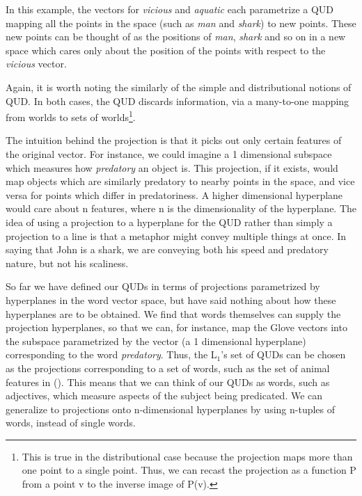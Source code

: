 \documentclass[10pt,letterpaper,twocolumn]{article}
\begin{document}
In this example, the vectors for \emph{vicious} and \emph{aquatic} each parametrize a QUD mapping all the points in the space (such as \emph{man} and \emph{shark}) to new points. These new points can be thought of as the positions of \emph{man}, \emph{shark} and so on in a new space which cares only about the position of the points with respect to the \emph{vicious} vector. 

Again, it is worth noting the similarly of the simple and distributional notions of QUD. In both cases, the QUD discards information, via a many-to-one mapping from worlds to sets of worlds\footnote{This is true in the distributional case because the projection  maps more than one point to a single point. Thus, we can recast the projection as a function P from a point v to the inverse image of P(v).}.

   


The intuition behind the projection is that it picks out only certain features of the original vector. For instance, we could imagine a 1 dimensional subspace which measures how \emph{predatory} an object is. This projection, if it exists, would map objects which are similarly predatory to nearby points in the space, and vice versa for points which differ in predatoriness. A higher dimensional hyperplane would care about n features, where n is the dimensionality of the hyperplane. The idea of using a projection to a hyperplane for the QUD rather than simply a projection to a line is that a metaphor might convey multiple things at once. In saying that John is a shark, we are conveying both his speed and predatory nature, but not his scaliness.

So far we have defined our QUDs in terms of projections parametrized by hyperplanes in the word vector space, but have said nothing about how these hyperplanes are to be obtained. We find that words themselves can supply the projection hyperplanes, so that we can, for instance, map the Glove vectors into the subspace parametrized by the vector (a 1 dimensional hyperplane) corresponding to the word \emph{predatory}. Thus, the L$_1$'s set of QUDs can be chosen as the projections corresponding to a set of words, such as the set of animal features in (\cite{kao}). This means that we can think of our QUDs as words, such as adjectives, which measure aspects of the subject being predicated. We can generalize to projections onto n-dimensional hyperplanes by using n-tuples of words, instead of single words.
\end{document}
